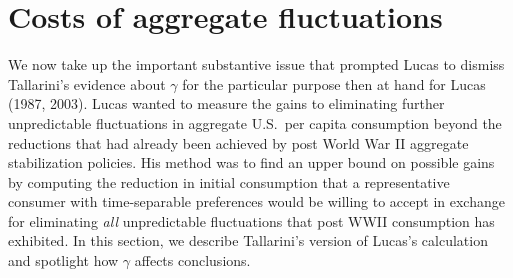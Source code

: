 \section{Costs of aggregate fluctuations}\label{sec:costsfluctuations}%
 We now take up the important substantive issue that prompted Lucas to dismiss Tallarini's evidence about $\gamma$ for the particular purpose then at hand for Lucas (1987, 2003).
 Lucas wanted to measure  the gains to eliminating further unpredictable fluctuations in aggregate U.S.\ per capita consumption beyond the reductions  that had
 already been achieved by post World War II aggregate stabilization policies. His method was to find an upper bound on   possible   gains by computing the reduction in initial consumption that a representative consumer with time-separable
 preferences would be willing to accept in exchange for  eliminating {\it all\/} unpredictable fluctuations that post WWII consumption has exhibited.  In this section, we describe Tallarini's version
 of Lucas's calculation and spotlight how  $\gamma$ affects conclusions.  

